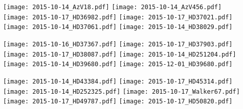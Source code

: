 \documentclass[a4paper]{aa}
\begin{document}






\newpage

\newpage

\newpage

\noindent
  \texttt{[image: 2015-10-14\_AzV18.pdf]}
  \texttt{[image: 2015-10-14\_AzV456.pdf]}\\
  \texttt{[image: 2015-10-17\_HD36982.pdf]}
  \texttt{[image: 2015-10-17\_HD37021.pdf]}\\
  \texttt{[image: 2015-10-14\_HD37061.pdf]}
  \texttt{[image: 2015-10-14\_HD38029.pdf]}
\newpage

\noindent
  \texttt{[image: 2015-10-16\_HD37367.pdf]}
  \texttt{[image: 2015-10-17\_HD37903.pdf]}\\
  \texttt{[image: 2015-10-17\_HD38087.pdf]}
  \texttt{[image: 2015-10-14\_HD251204.pdf]}\\
  \texttt{[image: 2015-10-14\_HD39680.pdf]}
  \texttt{[image: 2015-12-01\_HD39680.pdf]}
\newpage

\noindent
  \texttt{[image: 2015-10-14\_HD43384.pdf]}
  \texttt{[image: 2015-10-17\_HD45314.pdf]}\\
  \texttt{[image: 2015-10-14\_HD252325.pdf]}
  \texttt{[image: 2015-10-17\_Walker67.pdf]}\\
  \texttt{[image: 2015-10-17\_HD49787.pdf]}
  \texttt{[image: 2015-10-17\_HD50820.pdf]}
\newpage
\end{document}
